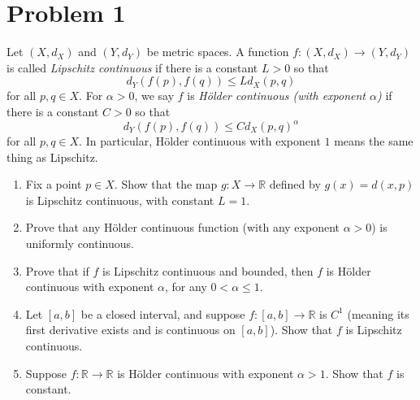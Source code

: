 \documentclass[11pt]{article}
\begin{document}
\section{Problem 1}
    Let $(X, d_X)$ and $(Y, d_Y)$ be metric spaces. A function $f : (X, d_X) \to (Y, d_Y)$ is called \textit{Lipschitz continuous} if there is a constant $L > 0$ so that
    \begin{equation*}
        d_Y(f(p), f(q)) \leq Ld_X(p, q)
    \end{equation*}
    for all $p, q \in X$. For $\alpha > 0$, we say $f$ is \textit{H\"older continuous (with exponent $\alpha$)} if there is a constant $C > 0$ so that
    \begin{equation*}
        d_Y(f(p), f(q)) \leq C d_X(p, q)^\alpha
    \end{equation*}
    for all $p, q \in X$. In particular, H\"older continuous with exponent $1$ means the same thing as Lipschitz.
    \begin{enumerate}[label=(\alph*)]
        \item 
        Fix a point $p \in X$. Show that the map $g : X \to \mathbb{R}$ defined by $g(x) = d(x, p)$ is Lipschitz continuous, with constant $L = 1$.
        
        \item 
        Prove that any H\"older continuous function (with any exponent $\alpha > 0$) is uniformly continuous.

        \item 
        Prove that if $f$ is Lipschitz continuous and bounded, then $f$ is H\"older continuous with exponent $\alpha$, for any $0 < \alpha \leq 1$.

        \item 
        Let $[a, b]$ be a closed interval, and suppose $f : [a, b] \to \mathbb{R}$ is $C^1$ (meaning its first derivative exists and is continuous on $[a, b]$). Show that $f$ is Lipschitz continuous.

        \item 
        Suppose $f : \mathbb{R} \to \mathbb{R}$ is H\"older continuous with exponent $\alpha > 1$. Show that $f$ is constant.
        
    \end{enumerate}
\end{document}
